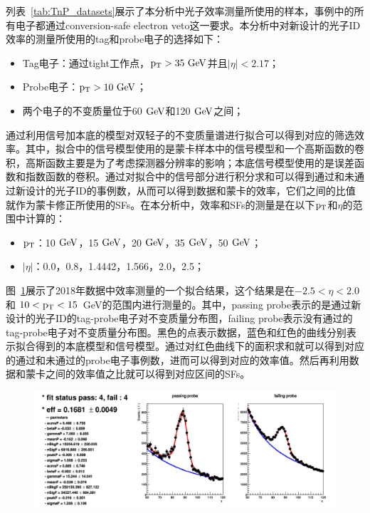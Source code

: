 列表~\ref{tab:TnP_datasets}展示了本分析中光子效率测量所使用的样本，事例中的所有电子都通过conversion-safe electron veto这一要求。本分析中对新设计的光子ID效率的测量所使用的tag和probe电子的选择如下：
\begin{itemize}
    \item Tag电子：通过tight工作点，$\pt>35\GeV$并且$|\eta|<2.17$；
    \item Probe电子：$\pt>10\GeV$；
    \item 两个电子的不变质量位于60$\GeV$和120$\GeV$之间；
\end{itemize}
通过利用信号加本底的模型对双轻子的不变质量谱进行拟合可以得到对应的筛选效率。其中，拟合中的信号模型使用的是蒙卡样本中的信号模型和一个高斯函数的卷积，高斯函数主要是为了考虑探测器分辨率的影响；本底信号模型使用的是误差函数和指数函数的卷积。通过对拟合中的信号部分进行积分求和可以得到通过和未通过新设计的光子ID的事例数，从而可以得到数据和蒙卡的效率，它们之间的比值就作为蒙卡修正所使用的SFs。在本分析中，效率和SFs的测量是在以下$\mathrm{p_{T}}$和$\eta$的范围中计算的：
\begin{itemize}
    \item $\mathrm{p_{T}}$：10$\GeV$，15$\GeV$，20$\GeV$，35$\GeV$，50$\GeV$；
    \item $|\eta|$：0.0，0.8，1.4442，1.566，2.0，2.5；
\end{itemize}

图~\ref{fig:IDCorr_eff_fit}展示了2018年数据中效率测量的一个拟合结果，这个结果是在$-2.5<\eta<2.0$ 和 $10<\mathrm{p_{T}}<15$~\si{GeV}的范围内进行测量的。其中，passing probe表示的是通过新设计的光子ID的tag-probe电子对不变质量分布图，failing probe表示没有通过的tag-probe电子对不变质量分布图。黑色的点表示数据，蓝色和红色的曲线分别表示拟合得到的本底模型和信号模型。通过对红色曲线下的面积求和就可以得到对应的通过和未通过的probe电子事例数，进而可以得到对应的效率值。然后再利用数据和蒙卡之间的效率值之比就可以得到对应区间的SFs。

\begin{figure}[htbp]
  \begin{center}
    \includegraphics[width=1.0\textwidth]{figures/chapter04/bin00_ph_sc_eta_m2p50Tom2p00_ph_et_10p00To15p00.png}
    \label{fig:IDCorr_eff_fit}
\end{center}
\end{figure}


